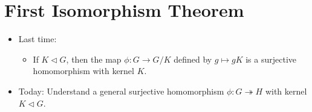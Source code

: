 \documentclass[../notes.tex]{subfiles}
\begin{document}
\section{First Isomorphism Theorem}
\begin{itemize}
    \item {}Last time:
    \begin{itemize}
        \item If $K\triangleleft G$, then the map $\phi:G\to G/K$ defined by $g\mapsto gK$ is a surjective homomorphism with kernel $K$.
    \end{itemize}
    \item Today: Understand a general surjective homomorphism $\phi:G\twoheadrightarrow H$ with kernel $K\triangleleft G$.
    \begin{figure}[H]
        \centering
\end{figure}
\end{itemize}
\end{document}

